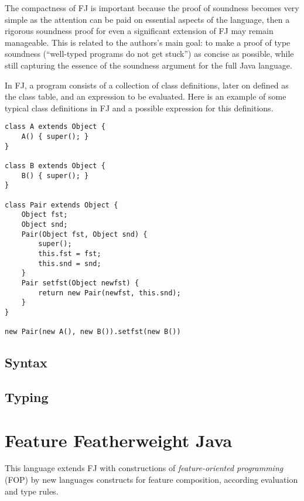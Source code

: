 The compactness of FJ is important because the proof of soundness becomes very
simple as the attention can be paid on essential aspects of the language, then
a rigorous soundness proof for even a significant extension of FJ may remain
manageable. This is related to the authors's main goal: to make a proof of type
soundness (``well-typed programs do not get stuck'') as concise as possible, while
still capturing the essence of the soundness argument for the full Java language.

In FJ, a program consists of a collection of class definitions, later on defined
as the class table, and an expression to be evaluated. Here is an example of some typical
class definitions in FJ and a possible expression for this definitions.

\begin{verbatim} 
class A extends Object {
    A() { super(); } 
} 

class B extends Object { 
    B() { super(); }
} 

class Pair extends Object { 
    Object fst; 
    Object snd;
    Pair(Object fst, Object snd) { 
        super(); 
        this.fst = fst; 
        this.snd = snd; 
    } 
    Pair setfst(Object newfst) { 
        return new Pair(newfst, this.snd); 
    } 
} 

new Pair(new A(), new B()).setfst(new B())
\end{verbatim}

\subsection{Syntax}



\subsection{Typing}

\section{Feature Featherweight Java}

This language extends FJ with constructions of \textit{feature-oriented
programming} (FOP) by new languages constructs for feature composition,
according evaluation and type rules.



